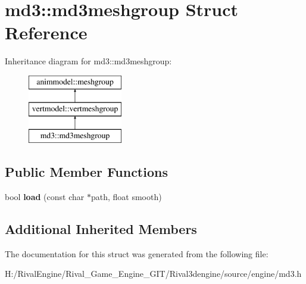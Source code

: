 \hypertarget{structmd3_1_1md3meshgroup}{}\section{md3\+:\+:md3meshgroup Struct Reference}
\label{structmd3_1_1md3meshgroup}
Inheritance diagram for md3\+:\+:md3meshgroup\+:\begin{figure}[H]
\begin{center}
\leavevmode
\includegraphics[height=3.000000cm]{structmd3_1_1md3meshgroup}
\end{center}
\end{figure}
\subsection*{Public Member Functions}
\begin{DoxyCompactItemize}
\item 
\mbox{\label{structmd3_1_1md3meshgroup_a611151bddf8f85e87c1ec785c2d46185}} 
bool {\bfseries load} (const char $\ast$path, float smooth)
\end{DoxyCompactItemize}
\subsection*{Additional Inherited Members}


The documentation for this struct was generated from the following file\+:\begin{DoxyCompactItemize}
\item 
H\+:/\+Rival\+Engine/\+Rival\+\_\+\+Game\+\_\+\+Engine\+\_\+\+G\+I\+T/\+Rival3dengine/source/engine/md3.\+h\end{DoxyCompactItemize}

